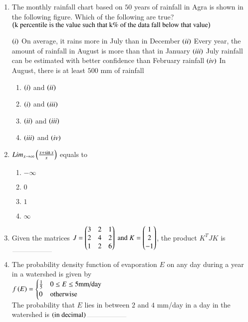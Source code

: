 \documentclass[journal,12pt,onecolumn]{IEEEtran}
\theoremstyle{remark}
\begin{document}
\begin{enumerate}
\item The monthly rainfall chart based on $50$ years of rainfall in Agra is shown in the following figure. Which of the following are true? $\left(\text{k percentile is the value such that k\% of the data fall below that value}\right)$
\begin{center}

\end{center}
$\left(i\right)$ On average, it rains more in July than in December
$\left(ii\right)$ Every year, the amount of rainfall in August is more than that in January
$\left(iii\right)$ July rainfall can be estimated with better confidence than February rainfall
$\left(iv\right)$ In August, there is at least $500$ mm of rainfall
\begin{enumerate}
\item $\left(i\right)$ and $\left(ii\right)$
\item $\left(i\right)$ and $\left(iii\right)$
\item $\left(ii\right)$ and $\left(iii\right)$
\item $\left(iii\right)$ and $\left(iv\right)$
\end{enumerate}

\item $Lim_{x\to \infty} \left(\frac{x+\sin x}{x}\right)$ equals to
\begin{enumerate}
\item $-\infty$
\item $0$
\item $1$
\item $\infty$
\end{enumerate}

\item Given the matrices $J = \begin{pmatrix}3 & 2 & 1\\2 & 4 & 2\\1 & 2 & 6\end{pmatrix} \text{ and } K = \begin{pmatrix}1\\2\\-1\end{pmatrix}$, the product $K^T JK$ is $\rule{2cm}{0.1pt}$

\item The probability density function of evaporation $E$ on any day during a year in a watershed is given by\\
$f\left(E\right) = 
\begin{cases}
\frac{1}{5} & 0\leq E \leq 5 \text{mm/day}\\
0 & \text{otherwise}
\end{cases}$\\
The probability that $E$ lies in between $2$ and $4$ mm/day in a day in the watershed is $\brak{\text{in decimal}}\rule{2cm}{0.1pt}$



\end{enumerate}
\end{document}

